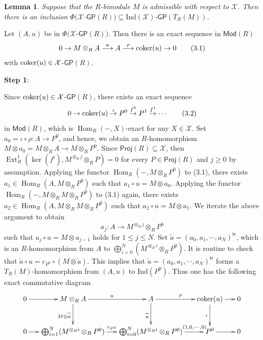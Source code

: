 \documentclass[10pt,twoside]{amsart}
\theoremstyle{bfupright head,slanted body}
\theoremstyle{bfupright head,upright body}
\theoremstyle{fixed bf head,slanted body}
\newtheorem{lem}[res]{Lemma}            \newtheorem*{lem*}{Lemma}
\theoremstyle{fixed bf head,upright body}
\theoremstyle{numbered paragraph}
\newenvironment{prf*}[1][Proof]{%
  \begin{proof}[\bf #1]
    \setcounter{equation}{0}
    \renewcommand{\theequation}{\arabic{equation}}}
  {\end{proof}
}
\numberwithin{equation}{res}
\newcommand{\GP}{\mathsf{GP}}
\newcommand{\tr}{\mathsf{tr}}
\newcommand{\Proj}{\mathsf{Proj}}
\newcommand{\Mod}{\mathsf{Mod}}
\newcommand{\Ind}{\mathrm{Ind}}
\newcommand{\cok}{\mbox{\rm coker}}
\newcommand{\Hom}{\operatorname{Hom}}
\newcommand{\Ext}{\operatorname{Ext}}
\begin{document}
\begin{lem} \label{Phi in GPTRM}
Suppose that the $R$-bimodule $M$ is admissible with respect to $\mathcal{X}$.
Then there is an inclusion $\Phi(\mathcal{X}$-$\GP(R)) \subseteq \Ind(\mathcal{X})$-$\GP(T_R(M))$.
\end{lem}

\begin{prf*}
Let $(A,u)$ be in $\Phi(\mathcal{X}$-$\GP(R))$.
Then there is an exact sequence in $\Mod(R)$
$$ 0 \to M\otimes_RA \overset{u}\longrightarrow A
\overset{\rho}\longrightarrow \cok(u) \to 0 \qquad(3.1)$$
with $\cok(u) \in \mathcal{X}$-$\GP(R)$.

\textbf{Step 1}:

Since $\cok(u) \in \mathcal{X}$-$\GP(R)$,
there exists an exact sequence
$$ 0\to\cok(u)\overset{\iota}\to P^{0} \overset{f^{0}}\to P^{1} \overset{f^{1}}\to \cdots \qquad(3.2)$$
in $\Mod(R)$, which is $\Hom_{R}(-, X)$-exact for any $X\in \mathcal{X}$.
Set $a_0= \iota \circ \rho : A \to P^{0}$, and hence,
we obtain an $R$-homomorphism
$M\otimes a_0= M\otimes_RA \to M\otimes_RP^{0}$.
Since $\Proj(R)\subseteq\mathcal{X}$,
then $\Ext_R^1(\ker(f^{i}),M^{\otimes_Rj}\otimes_RP)=0$ for every $P\in\Proj(R)$ and $j\geqslant 0$ by assumption.
Applying the functor $\Hom_R(-,M\otimes_RP^{0})$ to (3.1),
there exists $a_1\in \Hom_{R}(A, M\otimes_RP^{0})$ such that
$a_1 \circ u= M\otimes a_0$.
Applying the functor $\Hom_R(-,M\otimes_RM\otimes_RP^{0})$ to (3.1) again,
there exists $a_2\in \Hom_{R}(A, M\otimes_RM\otimes_RP^{0})$ such that
$a_2 \circ u= M\otimes a_1$.
We iterate the above argument to obtain
$$a_j: A \to M^{\otimes_Rj}\otimes_R P^{0}$$
such that $a_j \circ u= M\otimes a_{j-1}$ holds for $1 \leqslant j \leqslant N$.
Set $\widetilde{a}=(a_0, a_1, \cdots , a_N)^\tr$,
which is an $R$-homomorphism from
$A$ to $\bigoplus_{i=0}^N(M^{\otimes_Ri}\otimes_RP^{0})$.
It is routine to check that $\widetilde{a} \circ u = c_{P^{0}} \circ (M\otimes \widetilde{a})$.
This implies that $\widetilde{a}=(a_0, a_1, \cdots , a_N)^\tr$
forms a $T_R(M)$-homomorphism from $(A, u)$ to $\Ind(P^{0})$.
Thus one has the following exact commutative diagram
\begin{equation*}
\xymatrix@C=0.5cm@R=1cm{
  0 \ar[r] & M\otimes_RA \ar[d]_{M\otimes \widetilde{a}}\ar[r]^{u} & A \ar[d]_{\widetilde{a}}\ar[r]^{\rho} & \cok(u) \ar[d]_{\iota}\ar[r] & 0  \\
  0 \ar[r] & \bigoplus_{i=1}^N(M^{\otimes_Ri}\otimes_RP^{0}) \ar[r]^{c_{P^{0}}} & \bigoplus_{i=0}^N(M^{\otimes_Ri}\otimes_RP^{0}) \ar[r]^{\qquad \qquad (1,0,\cdots,0)} & P^{0} \ar[r] & 0}

\end{equation*}
\end{prf*}
\end{document}
